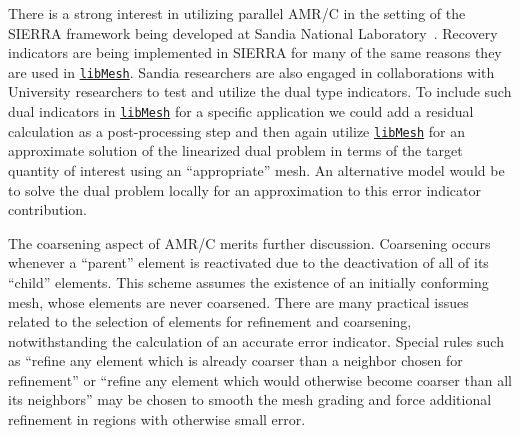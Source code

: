 \documentclass[global,twocolumn,final]{svjour}
\newcommand{\libMesh}{\href{http://libmesh.sourceforge.net}{\texttt{lib\-Mesh}}}
\begin{document}
There is a strong interest in utilizing parallel AMR/C in the setting
of the SIERRA framework being developed at Sandia National
Laboratory~\cite{sierra}.  Recovery indicators are being implemented
in SIERRA for many of the same reasons they are used in
\libMesh{}.  Sandia researchers are also engaged in collaborations
with University researchers to test and utilize the dual type
indicators.  To include such dual indicators in \libMesh{} for a
specific application we could add a residual calculation as a
post-processing step and then again utilize \libMesh{} for an
approximate solution of the linearized dual problem in terms of the
target quantity of interest using an ``appropriate'' mesh.  An
alternative model would be to solve the dual problem locally for an
approximation to this error indicator contribution.

The coarsening aspect of AMR/C merits further discussion.  Coarsening
occurs whenever a ``parent'' element is reactivated due to the
deactivation of all of its ``child'' elements.  This scheme assumes
the existence of an initially conforming mesh, whose elements
are never coarsened.  There are many practical issues related to the
selection of elements for refinement and coarsening, notwithstanding
the calculation of an accurate error indicator.
Special rules such as ``refine any element
which is already coarser than a neighbor chosen for refinement''
or ``refine any element which would otherwise become coarser than all
its neighbors'' may be chosen to smooth the mesh grading and
force additional refinement in regions with otherwise small error.
\end{document}
